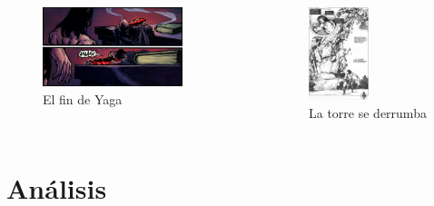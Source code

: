 \begin{frame}{}
\begin{columns}
    \begin{figure}[htb]
    \centering
        \includegraphics[width=0.8\textwidth]{img/res/21}
        \caption{El fin de Yaga}
    \end{figure}
    \begin{figure}[htb]
    \centering
        \includegraphics[width=0.5\textwidth]{img/res/22}
        \caption{La torre se derrumba}
    \end{figure}
\end{columns}
\end{frame}

\section{Análisis}
